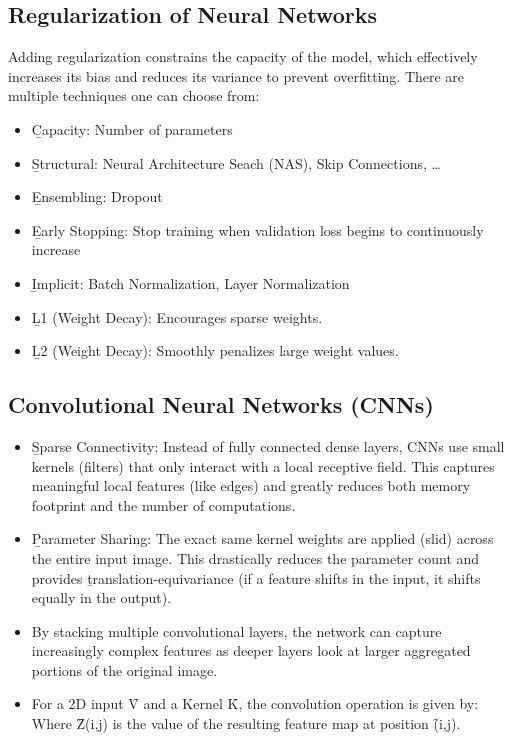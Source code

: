 



\subsection{Regularization of Neural Networks}
Adding regularization constrains the capacity of the model, which effectively increases its bias and reduces its variance to prevent overfitting. There are multiple techniques one can choose from:
\begin{itemize}
\item \b{Capacity}: Number of parameters
\item \b{Structural}: Neural Architecture Seach (NAS), Skip Connections, \dots
\item \b{Ensembling}: Dropout
\item \b{Early Stopping}: Stop training when validation loss begins to continuously increase
\item \b{Implicit}: Batch Normalization, Layer Normalization
\item \b{L1 (Weight Decay)}: Encourages sparse weights.
\item \b{L2 (Weight Decay)}: Smoothly penalizes large weight values.
\end{itemize}



\subsection{Convolutional Neural Networks (CNNs)}

\begin{itemize}
\item \b{Sparse Connectivity}: Instead of fully connected dense layers, CNNs use small kernels (filters) that only interact with a local receptive field. This captures meaningful local features (like edges) and greatly reduces both memory footprint and the number of computations.
\item \b{Parameter Sharing}: The exact same kernel weights are applied (slid) across the entire input image. This drastically reduces the parameter count and provides \b{translation-equivariance} (if a feature shifts in the input, it shifts equally in the output).
\item By stacking multiple convolutional layers, the network can capture increasingly complex features as deeper layers look at larger aggregated portions of the original image.
\item For a 2D input \f{V} and a Kernel \f{K}, the convolution operation is given by:
Where \f{Z(i,j)} is the value of the resulting feature map at position \f{(i,j)}. 
\end{itemize}

